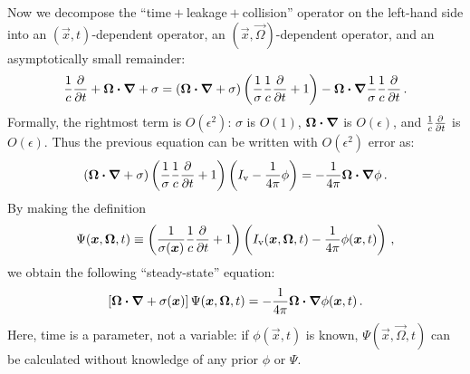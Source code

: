 Now we decompose the ``time${}+{}$leakage${}+{}$collision'' operator on the
left-hand side into an $(\vec{x},t)$-dependent operator, an
$(\vec{x},\vec{\Omega})$-dependent operator, and an asymptotically small
remainder:
\begin{equation*}
  \frac{1}{c}\frac{\partial }{\partial t}
  + \bm{\Omega}\bm{\cdot} \bm{\nabla}
  + \sigma
  =
  \left( \bm{\Omega}\bm{\cdot} \bm{\nabla} + \sigma \right)
  \left( \frac{1}{\sigma} \frac{1}{c}\frac{\partial }{\partial t} + 1 \right)
  -  \bm{\Omega}\bm{\cdot} \bm{\nabla} \frac{1}{\sigma} \frac{1}{c}\frac{\partial }{\partial t} \,.
\end{equation*}
Formally, the rightmost term is $O(\epsilon^2)$: $\sigma$ is $O(1)$,
$\bm{\Omega}\bm{\cdot}\bm{\nabla}$ is $O(\epsilon)$, and $\frac{1}{c}\frac{\partial }{\partial t}$ is
$O(\epsilon)$. Thus the previous equation can be written with $O(\epsilon^2)$
error as:
\begin{equation*}
  \left( \bm{\Omega}\bm{\cdot} \bm{\nabla} + \sigma \right)
  \left( \frac{1}{\sigma} \frac{1}{c}\frac{\partial }{\partial t} + 1 \right)
   \left( I_\mathrm{v} - \frac{1}{4\pi} \phi \right)
  = - \frac{1}{4\pi} \bm{\Omega}\bm{\cdot} \bm{\nabla} \phi\,.
\end{equation*}
By making the definition
\begin{equation}\label{eq:ap1capPsi}
  \Psi(\bm{x},\bm{\Omega},t)
  \equiv
  \left( \frac{1}{\sigma(\bm{x})} \frac{1}{c}\frac{\partial }{\partial t} + 1 \right)
  \left( I_\mathrm{v}(\bm{x},\bm{\Omega},t) - \frac{1}{4\pi} \phi(\bm{x},t) \right)\,,
\end{equation}
we obtain the following ``steady-state'' equation:
\begin{equation}\label{eq:ap1Ss}
  \left[ \bm{\Omega}\bm{\cdot} \bm{\nabla} + \sigma(\bm{x}) \right] \Psi(\bm{x},\bm{\Omega},t)
  = - \frac{1}{4\pi} \bm{\Omega}\bm{\cdot} \bm{\nabla} \phi (\bm{x},t)\,.
\end{equation}
Here, time is a parameter, not a variable: if $\phi(\vec{x},t)$ is known,
$\Psi(\vec{x},\vec{\Omega},t)$ can be calculated without knowledge of any prior
$\phi$ or $\Psi$.

